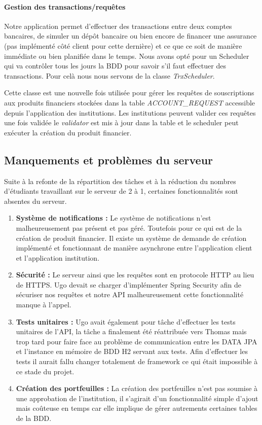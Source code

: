 \documentclass[../rapport.tex]{subfiles}
\begin{document}
\bigskip

\paragraph{Gestion des transactions/requêtes} 
Notre application permet d'effectuer des transactions entre deux comptes bancaires, de simuler un dépôt bancaire ou bien encore de financer une assurance (pas implémenté côté client pour cette
dernière) et ce que ce soit de manière immédiate ou bien planifiée dans le temps. Nous avons opté pour un Scheduler qui va contrôler tous les jours la BDD pour savoir s'il faut effectuer des 
transactions. Pour celà nous nous servons de la classe \textit{TrxScheduler}.

\medskip

Cette classe est une nouvelle fois utilisée pour gérer les requêtes de souscriptions aux produits financiers stockées dans la table \textit{ACCOUNT\_REQUEST} accessible depuis l'application
des institutions. Les institutions peuvent valider ces requêtes une fois validée le \textit{validator} est mis à jour dans la table et le scheduler peut exécuter la création du produit financier.


\bigskip

\subsection{Manquements et problèmes du serveur}
Suite à la refonte de la répartition des tâches et à la réduction du nombres d'étudiants travaillant sur le serveur de 2 à 1, certaines fonctionnalités sont absentes du serveur.

\medskip

	\begin{enumerate}
		\item\textbf{Système de notifications :} Le système de notifications n'est malheureusement pas présent et pas géré. Toutefois pour ce qui est de la création de produit
			financier. Il existe un système de demande de création implémenté et fonctionnant de manière asynchrone entre l'application client et l'application institution.
		\item\textbf{Sécurité : } Le serveur ainsi que les requêtes sont en protocole HTTP au lieu de HTTPS. Ugo devait se charger d'implémenter Spring Security afin de sécuriser nos requêtes
			et notre API malheureusement cette fonctionnalité manque à l'appel.
		\item\textbf{Tests unitaires : } Ugo avait également pour tâche d'effectuer les tests unitaires de l'API, la tâche a finalement été réattribuée vers Thomas mais trop tard pour faire 
			face au problème de communication entre les DATA JPA et l'instance en mémoire de BDD H2 servant aux tests. Afin d'effectuer les tests il aurait fallu changer totalement de framework
			ce qui était impossible à ce stade du projet.
		\item\textbf{Création des portfeuilles : } La création des portfeuilles n'est pas soumise à une approbation de l'institution, il s'agirait d'un fonctionnalité simple d'ajout mais coûteuse
			en temps car elle implique de gérer autrements certaines tables de la BDD.
	\end{enumerate}

\newpage
\end{document}

